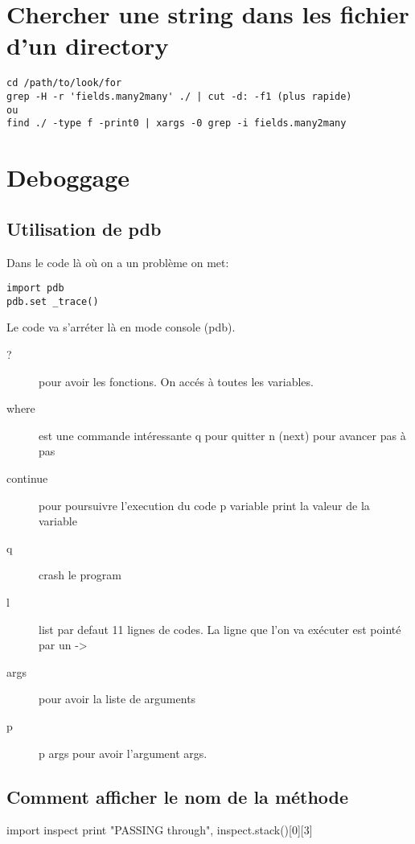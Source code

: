 \documentclass[12pt,a4paper]{article}
\begin{document}
\section{Chercher une string dans les fichier d'un directory}
\label{sec:search_string}

\begin{verbatim}
cd /path/to/look/for
grep -H -r 'fields.many2many' ./ | cut -d: -f1 (plus rapide)
ou
find ./ -type f -print0 | xargs -0 grep -i fields.many2many
\end{verbatim}

\section{Deboggage}
\label{sec:deboggage}

\subsection{Utilisation de pdb}
\label{sec:pdb}

Dans le code là où on a un problème on met:

\begin{verbatim}
import pdb
pdb.set _trace()
\end{verbatim}

Le code va s'arréter là en mode console (pdb).
\begin{description}
\item[?]  pour avoir les fonctions.  On accés à toutes les variables.
\item[where]   est une commande intéressante q pour quitter n (next) pour avancer pas à pas
\item[continue] pour poursuivre l'execution du code p variable print la valeur de la
  variable
\item[q] crash le program
\item[l] list par defaut 11 lignes de codes. La ligne que l'on va exécuter est pointé par un ->
\item[args] pour avoir la liste de arguments
\item[p] p args pour avoir l'argument args. 
\end{description}

\subsection{Comment afficher le nom de la méthode }
\label{sec:stack}

import inspect
print "PASSING through", inspect.stack()[0][3]
\end{document}
